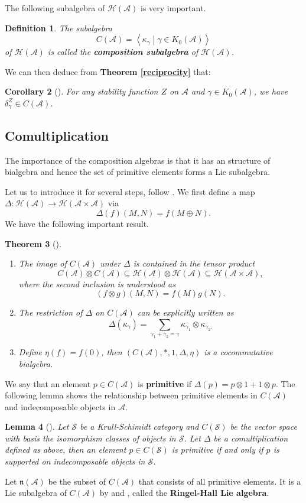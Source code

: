 \documentclass[a4paper,12pt]{amsart}
\newtheorem{theorem}{Theorem}[section]
\newtheorem{definition}[theorem]{Definition}
\newtheorem{lemma}[theorem]{Lemma}
\newtheorem{corollary}[theorem]{Corollary}
\newcommand{\linp}[1]{\left\langle#1\right\rangle}
\begin{document}
The following subalgebra of $\mathcal{H}(\mathcal{A})$ is very important.
\begin{definition}
    The subalgebra
    \[C(\mathcal{A})=\linp{\kappa_\gamma\middle|\gamma\in K_0(\mathcal{A})}\]
    of $\mathcal{H}(\mathcal{A})$ is called the \textbf{composition subalgebra} of $\mathcal{H}(\mathcal{A})$.
\end{definition}
We can then deduce from \textbf{Theorem \ref{reciprocity}} that:
\begin{corollary}[{\cite[Theorem 4.9]{Rei2002}}]
    For any stability function $Z$ on $\mathcal{A}$ and $\gamma\in K_0(\mathcal{A})$, we have $\delta^Z_\gamma\in C(\mathcal{A})$.
\end{corollary}
\subsection{Comultiplication}
The importance of the composition algebras is that it has an structure of bialgebra and hence the set of primitive elements forms a Lie subalgebra.

Let us to introduce it for several steps, follow \cite{BT2012}. We first define a map $\Delta:\mathcal{H}(\mathcal{A})\rightarrow\mathcal{H}(\mathcal{A}\times\mathcal{A})$ via
\[\Delta(f)(M,N)=f(M\oplus N).\]
We have the following important result.
\begin{theorem}[{\cite[Theorem 4.3]{BT2012}}]
\begin{enumerate}
    \item The image of $C(\mathcal{A})$ under $\Delta$ is contained in the tensor product
    \[C(\mathcal{A})\otimes C(\mathcal{A})\subseteq \mathcal{H}(\mathcal{A})\otimes\mathcal{H}(\mathcal{A})\subseteq\mathcal{H}(\mathcal{A\times A}),\]
    where the second inclusion is understood as
    \[(f\otimes g)(M,N)=f(M)g(N).\]
    \item The restriction of $\Delta$ on $C(\mathcal{A})$ can be explicitly written as
    \[\Delta(\kappa_\gamma)=\sum_{\gamma_1+\gamma_2=\gamma}\kappa_{\gamma_1}\otimes\kappa_{\gamma_2.}\]
    \item Define $\eta(f)=f(0)$, then $(C(\mathcal{A}),*,1,\Delta,\eta)$ is a cocommutative bialgebra.
\end{enumerate}
\end{theorem}
We say that an element $p\in C(\mathcal{A})$ is \textbf{primitive} if $\Delta(p)=p\otimes1+1\otimes p$. The following lemma shows the relationship between primitive elements in $C(\mathcal{A})$ and indecomposable objects in $\mathcal{A}$.
\begin{lemma}[\cite{Rin1992}]\label{primitive}
    Let $\mathcal{S}$ be a Krull-Schimidt category and $C(\mathcal{S})$ be the vector space with basis the isomorphism classes of objects in $\mathcal{S}$. Let $\Delta$ be a comultiplication defined as above, then an element $p\in C(\mathcal{S})$ is primitive if and only if $p$ is supported on indecomposable objects in $\mathcal{S}$.
\end{lemma}
Let $\mathfrak{n}(\mathcal{A})$ be the subset of $C(\mathcal{A})$ that consists of all primitive elements. It is a Lie subalgebra of $C(\mathcal{A})$ by \cite{Rie1994} and \cite{Rin1992}, called the \textbf{Ringel-Hall Lie algebra}.
\end{document}
